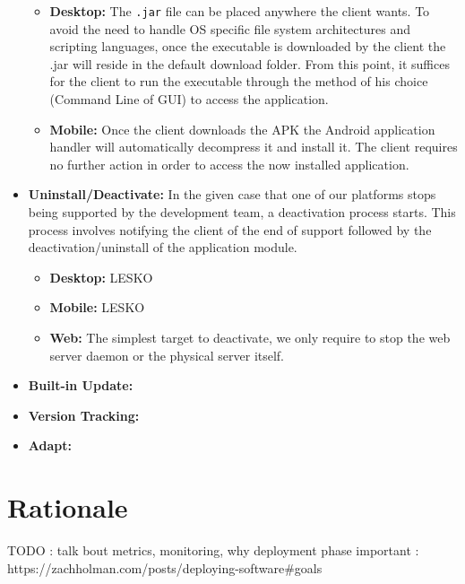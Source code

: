 \documentclass[12pt]{report}
\begin{document}
\begin{itemize}
    \begin{itemize}
        \item \textbf{Desktop:} The \texttt{.jar} file can be placed anywhere the client wants. To avoid the need to handle OS specific file system architectures and scripting languages, once the executable is downloaded by the client the .jar will reside in the default download folder. From this point, it suffices for the client to run the executable through the method of his choice (Command Line of GUI) to access the application.
        \item \textbf{Mobile:} Once the client downloads the APK the Android application handler will automatically decompress it and install it. The client requires no further action in order to access the now installed application.
    \end{itemize}
    \item \textbf{Uninstall/Deactivate:} In the given case that one of our platforms stops being supported by the development team, a deactivation process starts. This process involves notifying the client of the end of support followed by the deactivation/uninstall of the application module.
        \begin{itemize}
        \item \textbf{Desktop:} LESKO
        \item \textbf{Mobile:} LESKO
        \item \textbf{Web:} The simplest target to deactivate, we only require to stop the web server daemon or the physical server itself.
    \end{itemize}
    \item \textbf{Built-in Update:}
    \item \textbf{Version Tracking:}
    \item \textbf{Adapt:}
\end{itemize}
\section{Rationale}





TODO : talk bout metrics, monitoring, why deployment phase important : https://zachholman.com/posts/deploying-software#goals
\end{document}

